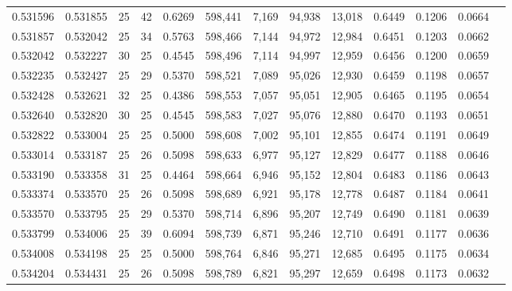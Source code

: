 \begin{tabular}{rrrrrrrrrrrrr}
0.531596 & 0.531855 &    25 &  42 &                                     0.6269 & 598,441 &   7,169 &  94,938 &  13,018 & 0.6449 & 0.1206 & 0.0664 \\
0.531857 & 0.532042 &    25 &  34 &                                     0.5763 & 598,466 &   7,144 &  94,972 &  12,984 & 0.6451 & 0.1203 & 0.0662 \\
0.532042 & 0.532227 &    30 &  25 &                                     0.4545 & 598,496 &   7,114 &  94,997 &  12,959 & 0.6456 & 0.1200 & 0.0659 \\
0.532235 & 0.532427 &    25 &  29 &                                     0.5370 & 598,521 &   7,089 &  95,026 &  12,930 & 0.6459 & 0.1198 & 0.0657 \\
0.532428 & 0.532621 &    32 &  25 &                                     0.4386 & 598,553 &   7,057 &  95,051 &  12,905 & 0.6465 & 0.1195 & 0.0654 \\
0.532640 & 0.532820 &    30 &  25 &                                     0.4545 & 598,583 &   7,027 &  95,076 &  12,880 & 0.6470 & 0.1193 & 0.0651 \\
0.532822 & 0.533004 &    25 &  25 &                                     0.5000 & 598,608 &   7,002 &  95,101 &  12,855 & 0.6474 & 0.1191 & 0.0649 \\
0.533014 & 0.533187 &    25 &  26 &                                     0.5098 & 598,633 &   6,977 &  95,127 &  12,829 & 0.6477 & 0.1188 & 0.0646 \\
0.533190 & 0.533358 &    31 &  25 &                                     0.4464 & 598,664 &   6,946 &  95,152 &  12,804 & 0.6483 & 0.1186 & 0.0643 \\
0.533374 & 0.533570 &    25 &  26 &                                     0.5098 & 598,689 &   6,921 &  95,178 &  12,778 & 0.6487 & 0.1184 & 0.0641 \\
0.533570 & 0.533795 &    25 &  29 &                                     0.5370 & 598,714 &   6,896 &  95,207 &  12,749 & 0.6490 & 0.1181 & 0.0639 \\
0.533799 & 0.534006 &    25 &  39 &                                     0.6094 & 598,739 &   6,871 &  95,246 &  12,710 & 0.6491 & 0.1177 & 0.0636 \\
0.534008 & 0.534198 &    25 &  25 &                                     0.5000 & 598,764 &   6,846 &  95,271 &  12,685 & 0.6495 & 0.1175 & 0.0634 \\
0.534204 & 0.534431 &    25 &  26 &                                     0.5098 & 598,789 &   6,821 &  95,297 &  12,659 & 0.6498 & 0.1173 & 0.0632 \\

\end{tabular}
